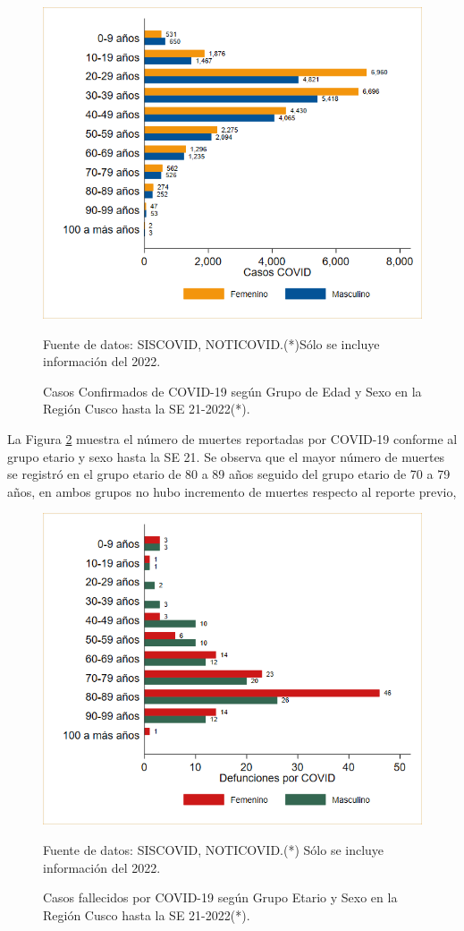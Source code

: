 \documentclass[12pt,a4paper,openany]{book}
\begin{document}
	
	\begin{figure}[h]
		\caption{Casos Confirmados de COVID-19 según Grupo de Edad y Sexo en la Región Cusco hasta la SE 21-2022(*).}\label{fig:casos_edad_sexo}
		\begin{center}
			\includegraphics[width=0.75\linewidth]{../figuras/casos_etapavida_2022}
		\end{center}
		{\footnotesize {Fuente de datos: SISCOVID, NOTICOVID.(*)Sólo se incluye información del 2022.}}
	\end{figure}
	\pagebreak
	
	
	La Figura \ref{fig:fallecidos_edad_sexo}  muestra el número de muertes reportadas por COVID-19 conforme al grupo etario y sexo hasta la SE 21. Se observa que el mayor número de muertes se registró en el grupo etario de 80 a 89 años seguido del grupo etario de 70 a 79 años, en ambos grupos no hubo incremento de muertes respecto al reporte previo, 
	
	\begin{figure}[h]
		\caption{Casos fallecidos por COVID-19 según Grupo Etario y Sexo en la Región Cusco hasta la SE 21-2022(*).}\label{fig:fallecidos_edad_sexo}
		\begin{center}
			\includegraphics[width=0.75\linewidth]{../figuras/defunciones_etapavida_2022}
		\end{center}
		{\footnotesize {Fuente de datos: SISCOVID, NOTICOVID.(*) Sólo se incluye información del 2022.}}
	\end{figure}
	
\end{document}
